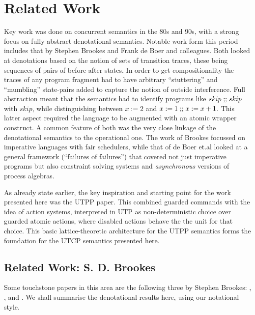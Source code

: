\section{Related Work}\label{sec:related}



Key work was done on concurrent semantics in the 80s and 90s,
with a strong focus on fully abstract denotational
semantics.
Notable work form this period includes that by
Stephen Brookes\cite{DBLP:journals/iandc/Brookes96}
and Frank de Boer and colleagues\cite{DBLP:conf/concur/BoerKPR91}.
Both looked at denotations based on the notion of sets of transition traces,
these being sequences of pairs of before-after states.
In order to get compositionality the traces of any program fragment
had to have arbitrary ``stuttering'' and ``mumbling'' state-pairs
added to capture the notion of outside interference.
Full abstraction meant that the semantics had to identify
programs like $skip\mathrel{\mathbf{;\!;}} skip$ with $skip$,
while distinguishing between $x:=2$ and $x:=1\mathrel{\mathbf{;\!;}} x:=x+1$.
This latter aspect required the language to be augmented with
an atomic wrapper construct.
A common feature of both was the very close linkage of the denotational
semantics to the operational one.
The work of Brookes\cite{DBLP:journals/iandc/Brookes96}
focussed on imperative languages with fair schedulers,
while that of de Boer et.al\cite{DBLP:conf/concur/BoerKPR91}
looked at a general framework (``failures of failures'')
that covered not just imperative programs
but also constraint solving systems
and \emph{asynchronous} versions of process algebras.

As already state earlier,
the key inspiration and starting point for the work presented here
was the UTPP paper\cite{DBLP:conf/icfem/WoodcockH02}.
This combined guarded commands\cite{1976:book:dijkstra}
with the idea of action systems\cite{PODC::BackK1983},
interpreted in UTP as non-deterministic choice
over guarded atomic actions,
where disabled actions behave the the unit for that choice.
This basic lattice-theoretic architecture for the UTPP semantics
forms the foundation for the UTCP semantics presented here.

\subsection{Related Work: S. D. Brookes}

Some touchstone papers in this area are the following three by
Stephen Brookes:
\cite{DBLP:conf/concur/Brookes84},
\cite{DBLP:conf/lics/Brooks93}, and
\cite{DBLP:journals/iandc/Brookes96}.
We shall summarise the denotational results here,
using our notational style.

